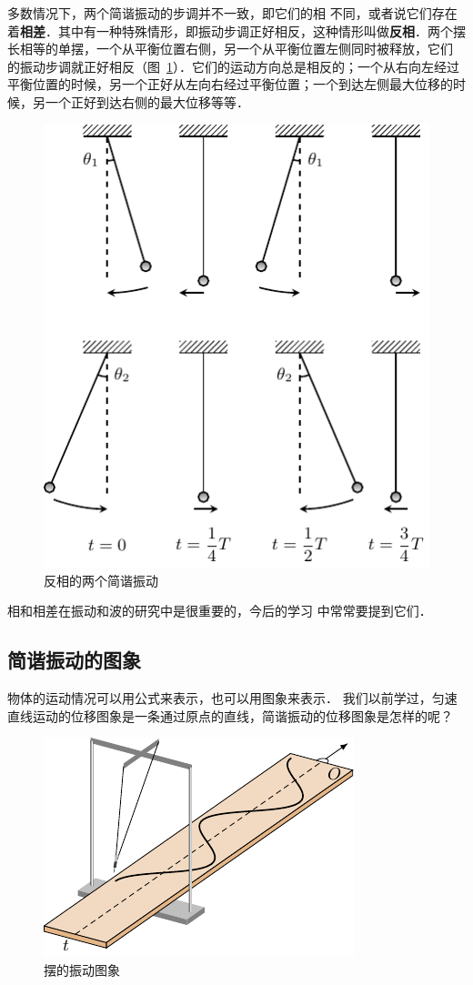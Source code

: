 多数情况下，两个简谐振动的步调并不一致，即它们的相
不同，或者说它们存在着\textbf{相差}．其中有一种特殊情形，即振动步调正好相反，这种情形叫做\textbf{反相}．两个摆长相等的单摆，一个从平衡位置右侧，另一个从平衡位置左侧同时被释放，它们
的振动步调就正好相反（图~\ref{fig_A_9-5}）．它们的运动方向总是相反的；一个从右向左经过平衡位置的时候，另一个正好从左向右经过平衡位置；一个到达左侧最大位移的时候，另一个正好到达右侧的最大位移等等．
\begin{figure}[htbp]
    \centering
    \includegraphics{fig/A/9-5.pdf}
    \caption{反相的两个简谐振动}\label{fig_A_9-5}
\end{figure}

相和相差在振动和波的研究中是很重要的，今后的学习
中常常要提到它们．

\subsection{简谐振动的图象}
物体的运动情况可以用公式来表示，也可以用图象来表示．
我们以前学过，匀速直线运动的位移图象是一条通过原点的直线，简谐振动的位移图象是怎样的呢？
\begin{figure}[htbp]
    \centering
    \includegraphics{fig/A/9-6.pdf}
    \caption{摆的振动图象}\label{fig_A_9-6}
\end{figure}

